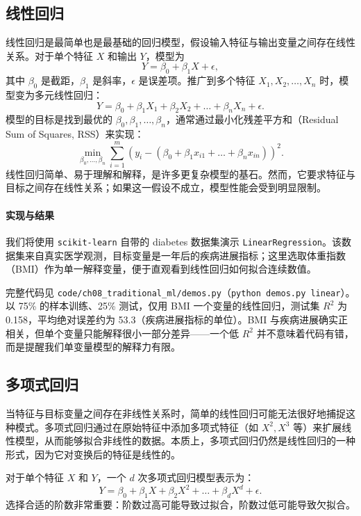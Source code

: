 \subsection{线性回归}

线性回归是最简单也是最基础的回归模型，假设输入特征与输出变量之间存在线性关系。对于单个特征 $X$ 和输出 $Y$，模型为
\[
Y = \beta_0 + \beta_1 X + \epsilon,
\]
其中 $\beta_0$ 是截距，$\beta_1$ 是斜率，$\epsilon$ 是误差项。推广到多个特征 $X_1, X_2, \ldots, X_n$ 时，模型变为多元线性回归：
\[
Y = \beta_0 + \beta_1 X_1 + \beta_2 X_2 + \ldots + \beta_n X_n + \epsilon.
\]
模型的目标是找到最优的 $\beta_0, \beta_1, \ldots, \beta_n$，通常通过最小化残差平方和（Residual Sum of Squares, RSS）来实现：
\[
\min_{\beta_0, \ldots, \beta_n} \sum_{i=1}^{m} \left(y_i - (\beta_0 + \beta_1 x_{i1} + \ldots + \beta_n x_{in})\right)^2.
\]
线性回归简单、易于理解和解释，是许多更复杂模型的基石。然而，它要求特征与目标之间存在线性关系；如果这一假设不成立，模型性能会受到明显限制。

\paragraph{实现与结果}
我们将使用 \texttt{scikit-learn} 自带的 diabetes 数据集演示 \texttt{LinearRegression}。该数据集来自真实医学观测，目标变量是一年后的疾病进展指标；这里选取体重指数（BMI）作为单一解释变量，便于直观看到线性回归如何拟合连续数值。

完整代码见 \texttt{code/ch08\_traditional\_ml/demos.py}（\texttt{python demos.py linear}）。以 75\% 的样本训练、25\% 测试，仅用 BMI 一个变量的线性回归，测试集 $R^2$ 为 0.158，平均绝对误差约为 53.3（疾病进展指标的单位）。BMI 与疾病进展确实正相关，但单个变量只能解释很小一部分差异——一个低 $R^2$ 并不意味着代码有错，而是提醒我们单变量模型的解释力有限。

\subsection{多项式回归}

当特征与目标变量之间存在非线性关系时，简单的线性回归可能无法很好地捕捉这种模式。多项式回归通过在原始特征中添加多项式特征（如 $X^2, X^3$ 等）来扩展线性模型，从而能够拟合非线性的数据。本质上，多项式回归仍然是线性回归的一种形式，因为它对变换后的特征是线性的。

对于单个特征 $X$ 和 $Y$，一个 $d$ 次多项式回归模型表示为：
\[
Y = \beta_0 + \beta_1 X + \beta_2 X^2 + \ldots + \beta_d X^d + \epsilon.
\]
选择合适的阶数非常重要：阶数过高可能导致过拟合，阶数过低可能导致欠拟合。

